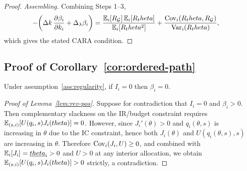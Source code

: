 \documentclass[master.tex]{subfiles}
\begin{document}
\begin{proof}
\noindent\textit{Assembling.} Combining Steps 1--3,
\[
-\!\left(
\Delta k\,\frac{\partial\beta_i}{\partial k_i}
+
\Delta_\lambda\beta_i
\right)
=
\frac{\mathbb{E}_i[R_\mathcal{G}]\,\mathbb{E}_i[R_theta]}{\mathbb{E}_i[R_theta^2]}
+
\frac{\mathrm{Cov}_i(R_theta,R_\mathcal{G})}{\mathrm{Var}_i(R_theta)},
\]
which gives the stated CARA condition.
\end{proof}


\subsection{Proof of Corollary~\ref{cor:ordered-path}}

\begin{lemma}\label{lem:rev-pos}
Under assumption~\ref{ass:regularity}, if $I_i=0$ then $\beta_i=0$.
\end{lemma}
\begin{proof}[Proof of Lemma~\ref{lem:rev-pos}]
Suppose for contradiction that $I_i=0$ and $\beta_i>0$. Then complementary slackness on the IR/budget constraint requires $\mathbb{E}_{(s,i)}[U(q_i,s)J_i(theta)]=0$. However, since $J_i'(\theta)>0$ and $q_i(\theta,s)$ is increasing in $\theta$ due to the IC constraint, hence both $J_i(\theta)$ and $U(q_i(\theta,s),s)$ are increasing in $\theta$. Therefore $\mathrm{Cov}_{i}(J_i,U)\ge 0$, and combined with $\mathbb{E}_i[J_i]=\underline{theta}_i>0$ and $U>0$ at any interior allocation, we obtain $\mathbb{E}_{(s,i)}[U(q_i,s)J_i(theta)]>0$ strictly, a contradiction.
\end{proof}
\end{document}
